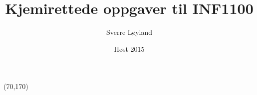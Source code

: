 
\title{Kjemirettede oppgaver til INF1100}
\author{Sverre Løyland}
\date{Høst 2015}

{
\begin{textblock}{20}(70,170)
\end{textblock}
\maketitle}